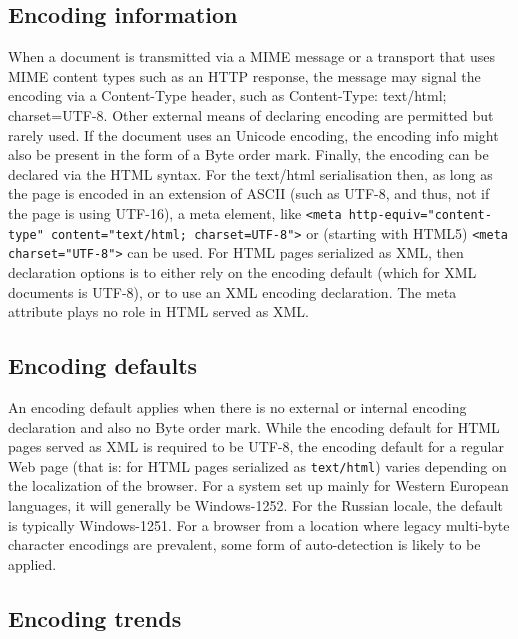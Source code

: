 \subsection{Encoding information}

When a document is transmitted via a MIME message or a transport that uses MIME content types such as an HTTP response, the message may signal the encoding via a Content-Type header, such as Content-Type: text/html; charset=UTF-8. Other external means of declaring encoding are permitted but rarely used. If the document uses an Unicode encoding, the encoding info might also be present in the form of a Byte order mark. Finally, the encoding can be declared via the HTML syntax. For the text/html serialisation then, as long as the page is encoded in an extension of ASCII (such as UTF-8, and thus, not if the page is using UTF-16), a meta element, like \texttt{<meta http-equiv="content-type" content="text/html; charset=UTF-8">} or (starting with HTML5) \texttt{<meta charset="UTF-8">} can be used. For HTML pages serialized as XML, then declaration options is to either rely on the encoding default (which for XML documents is UTF-8), or to use an XML encoding declaration. The meta attribute plays no role in HTML served as XML.




\subsection{Encoding defaults}

An encoding default applies when there is no external or internal encoding declaration and also no Byte order mark. While the encoding default for HTML pages served as XML is required to be UTF-8, the encoding default for a regular Web page (that is: for HTML pages serialized as \texttt{text/html}) varies depending on the localization of the browser. For a system set up mainly for Western European languages, it will generally be Windows-1252. For the Russian locale, the default is typically Windows-1251. For a browser from a location where legacy multi-byte character encodings are prevalent, some form of auto-detection is likely to be applied.




\subsection{Encoding trends}

